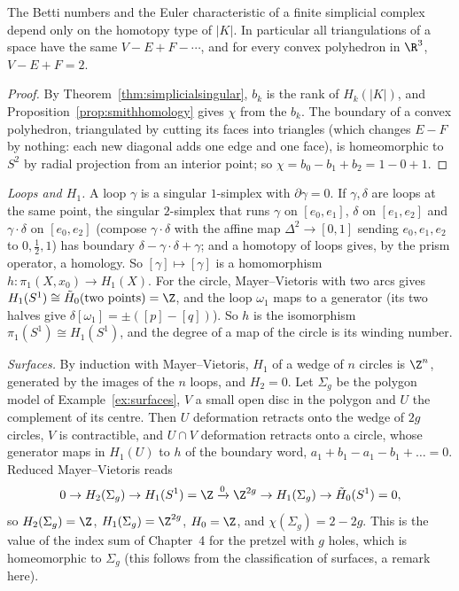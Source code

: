\begin{corollary}\label{cor:euler}
The Betti numbers and the Euler characteristic of a finite simplicial complex depend only on the homotopy type of $|K|$. In particular all triangulations of a space have the same $V-E+F-\cdots$,
and for every convex polyhedron in $\R^3$, $V-E+F=2$.
\end{corollary}

\begin{proof}
By Theorem~\ref{thm:simplicialsingular}, $b_k$ is the rank of $H_k(|K|)$, and Proposition~\ref{prop:smithhomology} gives $\chi$ from the $b_k$. The boundary of a convex polyhedron, triangulated by cutting its faces into triangles
(which changes $E-F$ by nothing: each new diagonal adds one edge and one face), is homeomorphic to $S^2$ by radial projection from an interior point; so $\chi=b_0-b_1+b_2=1-0+1$.
\end{proof}

\begin{example}\label{ex:surfacesH}
\emph{Loops and $H_1$.} A loop $\gamma$ is a singular $1$-simplex with $\partial\gamma=0$. If $\gamma,\delta$ are loops at the same point, the singular $2$-simplex that runs $\gamma$ on $[e_0,e_1]$, $\delta$ on $[e_1,e_2]$
and $\gamma\cdot\delta$ on $[e_0,e_2]$ (compose $\gamma\cdot\delta$ with the affine map $\Delta^2\to[0,1]$ sending $e_0,e_1,e_2$ to $0,\frac12,1$) has boundary $\delta-\gamma\cdot\delta+\gamma$; and a homotopy of loops gives, by the
prism operator, a homology. So $[\gamma]\mapsto[\gamma]$ is a homomorphism $h\colon\pi_1(X,x_0)\to H_1(X)$. For the circle, Mayer--Vietoris with two arcs gives $H_1(S^1)\cong\tilde H_0(\text{two points})=\Z$,
and the loop $\omega_1$ maps to a generator (its two halves give $\delta[\omega_1]=\pm([p]-[q])$). So $h$ is the isomorphism $\pi_1(S^1)\cong H_1(S^1)$, and the degree of a map of the circle is its winding number.

\emph{Surfaces.} By induction with Mayer--Vietoris, $H_1$ of a wedge of $n$ circles is $\Z^n$, generated by the images of the $n$ loops, and $H_2=0$. Let $\Sigma_g$ be the polygon model of
Example~\ref{ex:surfaces}, $V$ a small open disc in the polygon and $U$ the complement of its centre. Then $U$ deformation retracts onto the wedge of $2g$ circles, $V$ is contractible, and $U\cap V$
deformation retracts onto a circle, whose generator maps in $H_1(U)$ to $h$ of the boundary word, $a_1+b_1-a_1-b_1+\dots=0$. Reduced Mayer--Vietoris reads
\[0\to H_2(\Sigma_g)\to H_1(S^1)=\Z\xrightarrow{0}\Z^{2g}\to H_1(\Sigma_g)\to\tilde H_0(S^1)=0,\]
so $H_2(\Sigma_g)=\Z$, $H_1(\Sigma_g)=\Z^{2g}$, $H_0=\Z$, and $\chi(\Sigma_g)=2-2g$. This is the value of the index sum of Chapter~4 for the pretzel with $g$ holes, which is homeomorphic to
$\Sigma_g$ (this follows from the classification of surfaces, a remark here).
\end{example}

